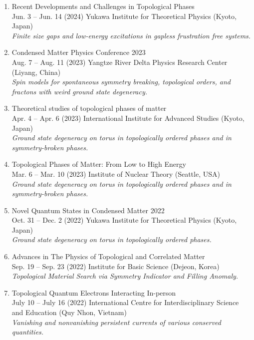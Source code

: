\documentclass[letterpaper,11pt]{article}
\begin{document}
\begin{enumerate}
\item Recent Developments and Challenges in Topological Phases\\
Jun. 3 -- Jun. 14 (2024) Yukawa Institute for Theoretical Physics (Kyoto, Japan)\\
\emph{Finite size gaps and low-energy excitations in gapless frustration free systems.}

\item Condensed Matter Physics Conference 2023\\
Aug. 7 -- Aug. 11 (2023) Yangtze River Delta Physics Research Center (Liyang, China)\\
\emph{Spin models for spontaneous symmetry breaking, topological orders, and fractons with weird ground state degeneracy.}

\item Theoretical studies of topological phases of matter\\
Apr. 4 -- Apr. 6 (2023) International Institute for Advanced Studies (Kyoto, Japan)\\
\emph{Ground state degeneracy on torus in topologically ordered phases and in symmetry-broken phases.}

\item Topological Phases of Matter: From Low to High Energy\\
Mar. 6 -- Mar. 10 (2023) Institute of Nuclear Theory (Seattle, USA)\\
\emph{Ground state degeneracy on torus in topologically ordered phases and in symmetry-broken phases.}

\item Novel Quantum States in Condensed Matter 2022\\
Oct. 31 -- Dec. 2 (2022) Yukawa Institute for Theoretical Physics (Kyoto, Japan)\\
\emph{Ground state degeneracy on torus in topologically ordered phases.}

\item Advances in The Physics of Topological and Correlated Matter\\
Sep. 19 -- Sep. 23 (2022) Institute for Basic Science (Dejeon, Korea)\\
\emph{Topological Material Search via Symmetry Indicator and Filling Anomaly.}

\item Topological Quantum Electrons Interacting In-person\\
July 10 -- July 16 (2022) International Centre for Interdisciplinary Science and Education (Quy Nhon, Vietnam)\\
\emph{Vanishing and nonvanishing persistent currents of various conserved quantities.}


\end{enumerate}
\end{document}
